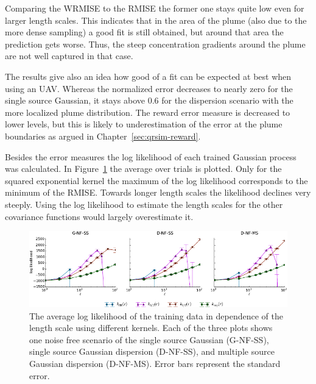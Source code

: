 Comparing the WRMISE to the RMISE the former one stays quite low even for larger 
length scales. This indicates that in the area of the plume (also due to the more 
dense sampling) a good fit is still obtained, but around that area the 
prediction gets worse. Thus, the steep concentration gradients around the plume 
are not well captured in that case.

The results give also an idea how good of a fit can be expected at best when 
using an UAV\@. Whereas the normalized error decreases to nearly zero for the 
single source Gaussian, it stays above 0.6 for the dispersion scenario with the 
more localized plume distribution. The reward error measure is decreased to 
lower levels, but this is likely to underestimation of the error at the plume 
boundaries as argued in Chapter~\ref{sec:qrsim-reward}.

Besides the error measures the log likelihood of each trained Gaussian process 
was calculated. In Figure~\ref{fig:loglikelihood} the average over trials is 
plotted. Only for the squared exponential kernel the maximum of the log 
likelihood corresponds to the minimum of the RMISE\@. Towards longer length 
scales the likelihood declines very steeply. Using the log likelihood to 
estimate the length scales for the other covariance functions would largely 
overestimate it.

\begin{figure}
    \centering
    \includegraphics{plots/loglikelihood}
    \caption[Log likelihood in dependence of the kernel lengthscale]{The average 
        log likelihood of the training data in dependence of the length scale 
        using different kernels.  Each of the three plots shows one noise free 
        scenario of the single source Gaussian (G-NF-SS), single source Gaussian 
        dispersion (D-NF-SS), and multiple source Gaussian dispersion (D-NF-MS).  
        Error bars represent the standard error.}\label{fig:loglikelihood}
\end{figure}

